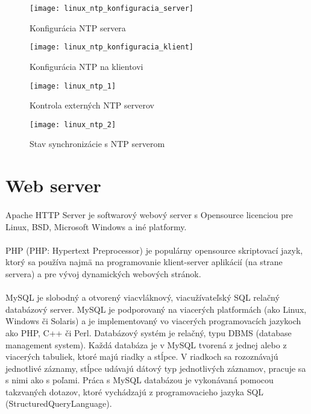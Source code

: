 \begin{figure}[!htb]
\centering
\texttt{[image: linux\_ntp\_konfiguracia\_server]}
\caption{Konfigurácia NTP servera}
\label{fig:x ntp_config_server}
\end{figure}

\begin{figure}[!htb]
\centering
\texttt{[image: linux\_ntp\_konfiguracia\_klient]}
\caption{Konfigurácia NTP na klientovi}
\label{fig:x ntp_config_client}
\end{figure}

\begin{figure}[!htb]
\centering
\texttt{[image: linux\_ntp\_1]}
\caption{Kontrola externých NTP serverov}
\label{fig:x ntp_config_valid_1}
\end{figure}

\begin{figure}[!htb]
\centering
\texttt{[image: linux\_ntp\_2]}
\caption{Stav synchronizácie s NTP serverom}
\label{fig:x ntp_config_valid_2}
\end{figure}

\section{Web server}
\paragraph{}
Apache HTTP Server je softwarový webový server s Opensource licenciou pre Linux, BSD, Microsoft Windows a iné platformy.
\paragraph{}
PHP (PHP: Hypertext Preprocessor) je populárny opensource skriptovací jazyk, ktorý sa používa najmä na programovanie klient-server aplikácií (na strane servera) a pre vývoj dynamických webových stránok.
\paragraph{}
MySQL je slobodný a otvorený viacvláknový, viacužívateľský SQL relačný databázový server. MySQL je podporovaný na viacerých platformách (ako Linux, Windows či Solaris) a je implementovaný vo viacerých programovacích jazykoch ako PHP, C++ či Perl. Databázový systém je relačný, typu DBMS (database management system). Každá databáza je v MySQL tvorená z jednej alebo z viacerých tabuliek, ktoré majú riadky a stĺpce. V riadkoch sa rozoznávajú jednotlivé záznamy, stĺpce udávajú dátový typ jednotlivých záznamov, pracuje sa s nimi ako s poľami. Práca s MySQL databázou je vykonávaná pomocou takzvaných dotazov, ktoré vychádzajú z programovacieho jazyka SQL (StructuredQueryLanguage).
